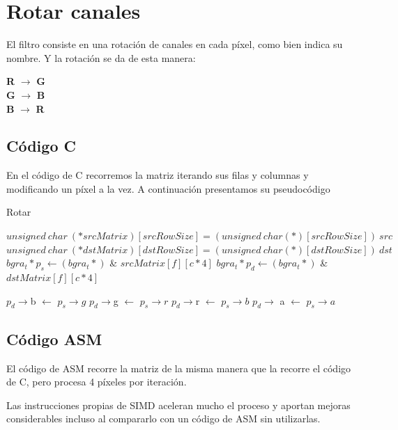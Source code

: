 \section{Rotar canales}
\par{El filtro consiste en una rotación de canales en cada píxel, como bien indica su nombre. Y la rotación se da de esta manera:}
\begin{center}
\textbf{R} $\longrightarrow$ \textbf{G}\\
\textbf{G} $\longrightarrow$ \textbf{B}\\
\textbf{B} $\longrightarrow$ \textbf{R}\\
\end{center}

\subsection{Código C}
\par{En el código de C recorremos la matriz iterando sus filas y columnas y modificando un píxel a la vez.
A continuación presentamos su pseudocódigo}

\begin{algorithm}[h!]
\caption{Rotar}
\begin{algorithmic}
	\State $unsigned~ char~ (*srcMatrix)[srcRowSize] = (unsigned~ char (*)[srcRowSize])~ src$
	\State $unsigned~ char~ (*dstMatrix)[dstRowSize] = (unsigned~ char (*)[dstRowSize])~ dst$
			\State $bgra_t* p_s \gets (bgra_t*)$ \& $srcMatrix[f][c * 4]$
			\State $bgra_t *p_d \gets (bgra_t*)$ \&$dstMatrix[f][c * 4]$
			
			\State $p_d \rightarrow$b $\gets$ $p_s \rightarrow g$
			\State $p_d \rightarrow$g $\gets$ $p_s \rightarrow r$
			\State $p_d \rightarrow$r $\gets$ $p_s \rightarrow b$
			\State $p_d \rightarrow$ a $\gets$ $p_s \rightarrow a$
		\EndFor
	\EndFor
\EndFunction
\end{algorithmic} 
\end{algorithm}
	
\subsection{Código ASM}
\par{El código de ASM recorre la matriz de la misma manera que la recorre el código de C, pero procesa 4 píxeles por iteración.}
\par{Las instrucciones propias de SIMD aceleran mucho el proceso y aportan mejoras considerables incluso al compararlo con un código de ASM sin utilizarlas.}

